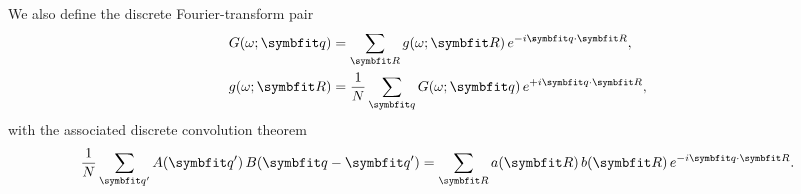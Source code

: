 We also define the discrete Fourier-transform pair
\begin{align}
  G(\omega;\vq) &= \sum_{\vR} g(\omega;\vR)\,e^{-i\vq\cdot\vR},
  \label{eq:dft_fwd} \\
  g(\omega;\vR) &= \frac{1}{N}\sum_{\vq} G(\omega;\vq)\,e^{+i\vq\cdot\vR},
  \label{eq:dft_inv}
\end{align}
with the associated discrete convolution theorem
\begin{equation}\label{eq:conv_theorem}
  \frac{1}{N}\sum_{\vq'} A(\vq')\,B(\vq-\vq')
  = \sum_{\vR} a(\vR)\,b(\vR)\,e^{-i\vq\cdot\vR}.
\end{equation}